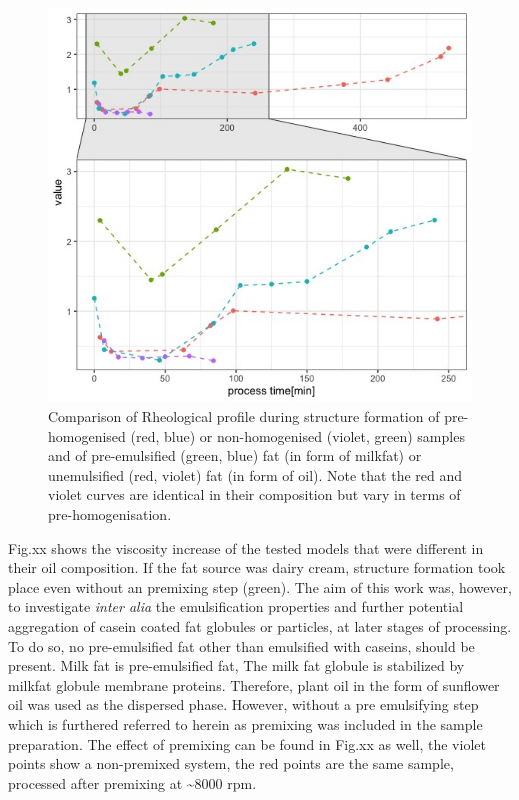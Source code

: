 \documentclass[
]{article}
\begin{document}
\begin{figure}
\includegraphics[width=0.75\linewidth]{plots/1.2_fatvar.rheo} \caption[Effect of premixing on the rheological profile of tested samples]{Comparison of Rheological profile during structure formation of pre-homogenised (red, blue) or non-homogenised (violet, green) samples and of pre-emulsified (green, blue) fat (in form of milkfat) or unemulsified (red, violet) fat (in form of oil). Note that the red and violet curves are identical in their composition but vary in terms of pre-homogenisation.}\label{fig:unnamed-chunk-6}
\end{figure}

Fig.xx shows the viscosity increase of the tested models that were
different in their oil composition. If the fat source was dairy cream,
structure formation took place even without an premixing step (green).
The aim of this work was, however, to investigate \emph{inter alia} the
emulsification properties and further potential aggregation of casein
coated fat globules or particles, at later stages of processing. To do
so, no pre-emulsified fat other than emulsified with caseins, should be
present. Milk fat is pre-emulsified fat, The milk fat globule is
stabilized by milkfat globule membrane proteins. Therefore, plant oil in
the form of sunflower oil was used as the dispersed phase. However,
without a pre emulsifying step which is furthered referred to herein as
premixing was included in the sample preparation. The effect of
premixing can be found in Fig.xx as well, the violet points show a
non-premixed system, the red points are the same sample, processed after
premixing at \textasciitilde8000 rpm.
\end{document}
